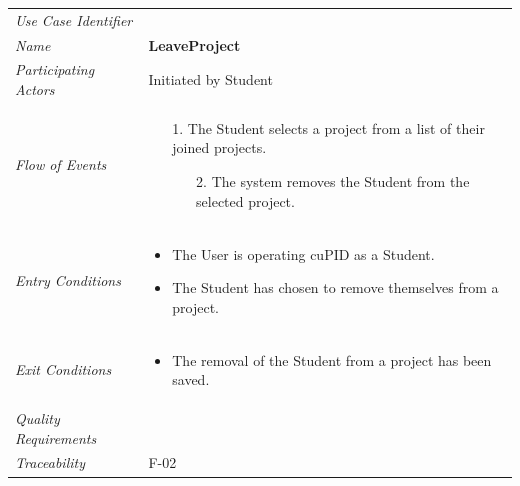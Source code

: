 \documentclass[12pt,letterpaper]{article}
\begin{document}
\begin{center}
	\begin{tabu} to 
		\toprule
		Use Case Identifier & \leaveproject{} \\
		Name & {\bf LeaveProject} \\
		Participating Actors & Initiated by Student \\
		Flow of Events & 
		\begin{minipage}[t]{\linewidth}
		    \begin{enumerate}[topsep=-1em, leftmargin=*]
			    \item[1.] The Student selects a project from a list of their joined projects.
			    \begin{enumerate}
			    		\item[2.] The system removes the Student from the selected project.
			    \end{enumerate}
			\end{enumerate}
		\end{minipage} \\

		Entry Conditions &
		\begin{minipage}[t]{\linewidth}
			\begin{itemize}[topsep=-1em, leftmargin=*]
			    \item The User is operating cuPID as a Student.
			    \item The Student has chosen to remove themselves from a project.
	        \end{itemize}
		\end{minipage} \\

		Exit Conditions &
		\begin{minipage}[t]{\linewidth}
			\begin{itemize}[topsep=-1em, leftmargin=*]
			    \item The removal of the Student from a project has been saved.
	        \end{itemize}
		\end{minipage} \\

		Quality Requirements & \\

		Traceability & F-02 \\
		\toprule
	\end{tabu}
\end{center}
\end{document}
